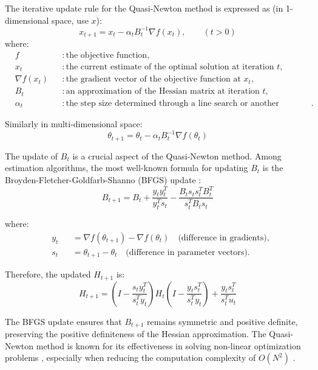 \documentclass[12pt,a4paper]{article}
\begin{document}
The iterative update rule for the Quasi-Newton method is expressed as (in 1-dimensional space, use \(x\)):
\begin{equation}
	x_{t+1} = x_t - \alpha_t B_t^{-1} \nabla f(x_t), \qquad (t>0)
\end{equation}
where:
\begin{align*}
	& f && : \text{the objective function}, \\
	& x_t && : \text{the current estimate of the optimal solution at iteration } t, \\
	& \nabla f(x_t) && : \text{the gradient vector of the objective function at } x_t, \\
	& B_t && : \text{an approximation of the Hessian matrix at iteration } t, \\
	& \alpha_t && : \text{the step size determined through a line search or another optimization strategy}.
\end{align*}

Similarly in multi-dimensional space:
\begin{equation}
	\theta_{t+1} = \theta_t - \alpha_t B_t^{-1} \nabla f(\theta_t)
\end{equation}

The update of \(B_t\) is a crucial aspect of the Quasi-Newton method. Among estimation algorithms, the most well-known formula for updating \(B_t\) is the Broyden-Fletcher-Goldfarb-Shanno (BFGS) update \cite{newton}:
\begin{equation}
	B_{t+1} = B_t + \frac{y_t y_t^T}{y_t^T s_t} - \frac{B_t s_t s_t^T B_t^T}{s_t^T B_t s_t}
\end{equation}

where:
\begin{align*}
	& y_t && = \nabla f(\theta_{t+1}) - \nabla f(\theta_t) \quad \text{(difference in gradients)}, \\
	& s_t && = \theta_{t+1} - \theta_t \quad \text{(difference in parameter vectors)}.
\end{align*}

Therefore, the updated $H_{t+1}$ is:
\begin{equation}
	H_{t+1} = \left(I - \dfrac{s_ty_t^T}{s_t^Ty_t}\right) H_t\left(I - \dfrac{y_ts_t^T}{s_t^Ty_t}\right) + \dfrac{y_ts_t^T}{s_t^Tu_t}
\end{equation}

The BFGS update ensures that \(B_{t+1}\) remains symmetric and positive definite, preserving the positive definiteness of the Hessian approximation. The Quasi-Newton method is known for its effectiveness in solving non-linear optimization problems \cite{optimization}, especially when reducing the computation complexity of $O(N^2)$ \cite{newton}.
\end{document}

